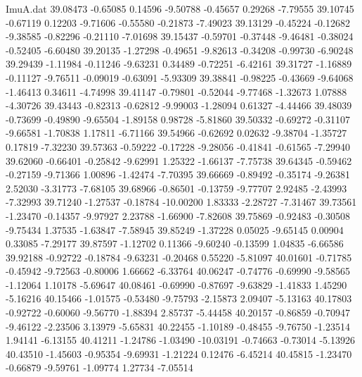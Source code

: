 \begin{filecontents}{ImuA.dat}
  39.08473   -0.65085    0.14596   -9.50788   -0.45657    0.29268   -7.79555
  39.10745   -0.67119    0.12203   -9.71606   -0.55580   -0.21873   -7.49023
  39.13129   -0.45224   -0.12682   -9.38585   -0.82296   -0.21110   -7.01698
  39.15437   -0.59701   -0.37448   -9.46481   -0.38024   -0.52405   -6.60480
  39.20135   -1.27298   -0.49651   -9.82613   -0.34208   -0.99730   -6.90248
  39.29439   -1.11984   -0.11246   -9.63231    0.34489   -0.72251   -6.42161
  39.31727   -1.16889   -0.11127   -9.76511   -0.09019   -0.63091   -5.93309
  39.38841   -0.98225   -0.43669   -9.64068   -1.46413    0.34611   -4.74998
  39.41147   -0.79801   -0.52044   -9.77468   -1.32673    1.07888   -4.30726
  39.43443   -0.82313   -0.62812   -9.99003   -1.28094    0.61327   -4.44466
  39.48039   -0.73699   -0.49890   -9.65504   -1.89158    0.98728   -5.81860
  39.50332   -0.69272   -0.31107   -9.66581   -1.70838    1.17811   -6.71166
  39.54966   -0.62692    0.02632   -9.38704   -1.35727    0.17819   -7.32230
  39.57363   -0.59222   -0.17228   -9.28056   -0.41841   -0.61565   -7.29940
  39.62060   -0.66401   -0.25842   -9.62991    1.25322   -1.66137   -7.75738
  39.64345   -0.59462   -0.27159   -9.71366    1.00896   -1.42474   -7.70395
  39.66669   -0.89492   -0.35174   -9.26381    2.52030   -3.31773   -7.68105
  39.68966   -0.86501   -0.13759   -9.77707    2.92485   -2.43993   -7.32993
  39.71240   -1.27537   -0.18784  -10.00200    1.83333   -2.28727   -7.31467
  39.73561   -1.23470   -0.14357   -9.97927    2.23788   -1.66900   -7.82608
  39.75869   -0.92483   -0.30508   -9.75434    1.37535   -1.63847   -7.58945
  39.85249   -1.37228    0.05025   -9.65145    0.00904    0.33085   -7.29177
  39.87597   -1.12702    0.11366   -9.60240   -0.13599    1.04835   -6.66586
  39.92188   -0.92722   -0.18784   -9.63231   -0.20468    0.55220   -5.81097
  40.01601   -0.71785   -0.45942   -9.72563   -0.80006    1.66662   -6.33764
  40.06247   -0.74776   -0.69990   -9.58565   -1.12064    1.10178   -5.69647
  40.08461   -0.69990   -0.87697   -9.63829   -1.41833    1.45290   -5.16216
  40.15466   -1.01575   -0.53480   -9.75793   -2.15873    2.09407   -5.13163
  40.17803   -0.92722   -0.60060   -9.56770   -1.88394    2.85737   -5.44458
  40.20157   -0.86859   -0.70947   -9.46122   -2.23506    3.13979   -5.65831
  40.22455   -1.10189   -0.48455   -9.76750   -1.23514    1.94141   -6.13155
  40.41211   -1.24786   -1.03490  -10.03191   -0.74663   -0.73014   -5.13926
  40.43510   -1.45603   -0.95354   -9.69931   -1.21224    0.12476   -6.45214
  40.45815   -1.23470   -0.66879   -9.59761   -1.09774    1.27734   -7.05514

\end{filecontents}
